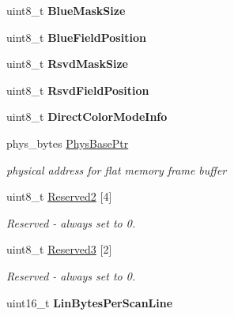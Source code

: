 \begin{DoxyCompactItemize}
\item 
\hypertarget{group__vbe_ga84842a6a42e881ce7be87482122bcc4e}{}uint8\+\_\+t {\bfseries Blue\+Mask\+Size}\label{group__vbe_ga84842a6a42e881ce7be87482122bcc4e}

\item 
\hypertarget{group__vbe_ga4d0396c07a4f07556332fec2b4a6c2bf}{}uint8\+\_\+t {\bfseries Blue\+Field\+Position}\label{group__vbe_ga4d0396c07a4f07556332fec2b4a6c2bf}

\item 
\hypertarget{group__vbe_ga87d544680f1132f30b038c0ebf0b829b}{}uint8\+\_\+t {\bfseries Rsvd\+Mask\+Size}\label{group__vbe_ga87d544680f1132f30b038c0ebf0b829b}

\item 
\hypertarget{group__vbe_gaa357b085181776f2918a6df25c88846b}{}uint8\+\_\+t {\bfseries Rsvd\+Field\+Position}\label{group__vbe_gaa357b085181776f2918a6df25c88846b}

\item 
\hypertarget{group__vbe_ga3bf2fd2394ec8649ec3d26104be35dd7}{}uint8\+\_\+t {\bfseries Direct\+Color\+Mode\+Info}\label{group__vbe_ga3bf2fd2394ec8649ec3d26104be35dd7}

\item 
\hypertarget{group__vbe_ga1d11f4921094db253fc2c2ee6fbb2afb}{}phys\+\_\+bytes \hyperlink{group__vbe_ga1d11f4921094db253fc2c2ee6fbb2afb}{Phys\+Base\+Ptr}\label{group__vbe_ga1d11f4921094db253fc2c2ee6fbb2afb}

\begin{DoxyCompactList}\small\item\em physical address for flat memory frame buffer \end{DoxyCompactList}\item 
\hypertarget{group__vbe_ga09b5824ec5c67bee2a4b36c0ab5181bc}{}uint8\+\_\+t \hyperlink{group__vbe_ga09b5824ec5c67bee2a4b36c0ab5181bc}{Reserved2} \mbox{[}4\mbox{]}\label{group__vbe_ga09b5824ec5c67bee2a4b36c0ab5181bc}

\begin{DoxyCompactList}\small\item\em Reserved -\/ always set to 0. \end{DoxyCompactList}\item 
\hypertarget{group__vbe_ga2455a82e0d8cc0e8d76e8cf77a68bd39}{}uint8\+\_\+t \hyperlink{group__vbe_ga2455a82e0d8cc0e8d76e8cf77a68bd39}{Reserved3} \mbox{[}2\mbox{]}\label{group__vbe_ga2455a82e0d8cc0e8d76e8cf77a68bd39}

\begin{DoxyCompactList}\small\item\em Reserved -\/ always set to 0. \end{DoxyCompactList}\item 
\hypertarget{group__vbe_ga53c5060b6ac14a7418ca8421edfb9981}{}uint16\+\_\+t {\bfseries Lin\+Bytes\+Per\+Scan\+Line}\label{group__vbe_ga53c5060b6ac14a7418ca8421edfb9981}


\end{DoxyCompactItemize}
